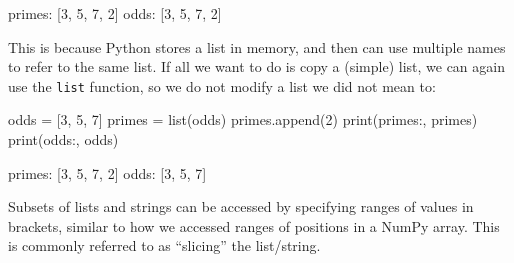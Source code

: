 \documentclass[
  letterpaper,
  DIV=11,
  numbers=noendperiod]{scrartcl}
\newenvironment{Shaded}{\begin{snugshade}}{\end{snugshade}}
\newcommand{\BuiltInTok}[1]{\textcolor[rgb]{0.00,0.23,0.31}{#1}}
\newcommand{\DecValTok}[1]{\textcolor[rgb]{0.68,0.00,0.00}{#1}}
\newcommand{\NormalTok}[1]{\textcolor[rgb]{0.00,0.23,0.31}{#1}}
\newcommand{\OperatorTok}[1]{\textcolor[rgb]{0.37,0.37,0.37}{#1}}
\newcommand{\StringTok}[1]{\textcolor[rgb]{0.13,0.47,0.30}{#1}}
\theoremstyle{remark}
\begin{document}
\begin{Shaded}
\begin{Highlighting}[]
\NormalTok{primes: [3, 5, 7, 2]}
\NormalTok{odds: [3, 5, 7, 2]}
\end{Highlighting}
\end{Shaded}

This is because Python stores a list in memory, and then can use
multiple names to refer to the same list. If all we want to do is copy a
(simple) list, we can again use the \texttt{list} function, so we do not
modify a list we did not mean to:

\begin{Shaded}
\begin{Highlighting}[]
\NormalTok{odds }\OperatorTok{=}\NormalTok{ [}\DecValTok{3}\NormalTok{, }\DecValTok{5}\NormalTok{, }\DecValTok{7}\NormalTok{]}
\NormalTok{primes }\OperatorTok{=} \BuiltInTok{list}\NormalTok{(odds)}
\NormalTok{primes.append(}\DecValTok{2}\NormalTok{)}
\BuiltInTok{print}\NormalTok{(}\StringTok{\textquotesingle{}primes:\textquotesingle{}}\NormalTok{, primes)}
\BuiltInTok{print}\NormalTok{(}\StringTok{\textquotesingle{}odds:\textquotesingle{}}\NormalTok{, odds)}
\end{Highlighting}
\end{Shaded}

\begin{Shaded}
\begin{Highlighting}[]
\NormalTok{primes: [3, 5, 7, 2]}
\NormalTok{odds: [3, 5, 7]}
\end{Highlighting}
\end{Shaded}

Subsets of lists and strings can be accessed by specifying ranges of
values in brackets, similar to how we accessed ranges of positions in a
NumPy array. This is commonly referred to as ``slicing'' the
list/string.
\end{document}
